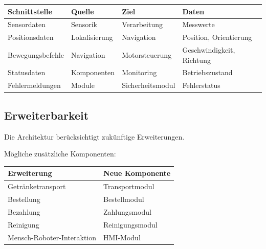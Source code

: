 \documentclass[
  a4paper,
  12pt,
  DIV=12,        %
  parskip=half,  %
  headings=small %
]{scrartcl}
\theoremstyle{definition}
\theoremstyle{definition}
\begin{document}
\begin{longtable}[]{@{}
  >{\raggedright\arraybackslash}p{}
  >{\raggedright\arraybackslash}p{}
  >{\raggedright\arraybackslash}p{}
  >{\raggedright\arraybackslash}p{}@{}}
\toprule\noalign{}
\begin{minipage}[b]{\linewidth}\raggedright
Schnittstelle
\end{minipage} & \begin{minipage}[b]{\linewidth}\raggedright
Quelle
\end{minipage} & \begin{minipage}[b]{\linewidth}\raggedright
Ziel
\end{minipage} & \begin{minipage}[b]{\linewidth}\raggedright
Daten
\end{minipage} \\
\midrule\noalign{}
\endhead
\bottomrule\noalign{}
\endlastfoot
Sensordaten & Sensorik & Verarbeitung & Messwerte \\
Positionsdaten & Lokalisierung & Navigation & Position, Orientierung \\
Bewegungsbefehle & Navigation & Motorsteuerung & Geschwindigkeit,
Richtung \\
Statusdaten & Komponenten & Monitoring & Betriebszustand \\
Fehlermeldungen & Module & Sicherheitsmodul & Fehlerstatus \\
\end{longtable}

\subsection{Erweiterbarkeit}\label{erweiterbarkeit-1}

Die Architektur berücksichtigt zukünftige Erweiterungen.

Mögliche zusätzliche Komponenten:

\begin{longtable}[]{@{}ll@{}}
\toprule\noalign{}
Erweiterung & Neue Komponente \\
\midrule\noalign{}
\endhead
\bottomrule\noalign{}
\endlastfoot
Getränketransport & Transportmodul \\
Bestellung & Bestellmodul \\
Bezahlung & Zahlungsmodul \\
Reinigung & Reinigungsmodul \\
Mensch-Roboter-Interaktion & HMI-Modul \\
\end{longtable}
\end{document}
